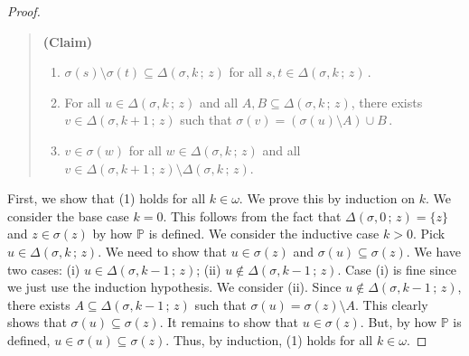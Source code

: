 \documentclass[10pt,a4paper]{amsart}
\begin{document}
\begin{proof}
\begin{quote} {\bf (Claim)}
\begin{enumerate}
  
    
  \item   $  \sigma (s)  \setminus  \sigma (t)   \subseteq       \Delta \left(  \sigma , k   \,  ;   \,   z  \right)    $
  for all $  s, t  \in     \Delta \left(  \sigma , k   \,  ;   \,   z  \right)         \,   $. 
  
  
  
  
  
  \item  For all $  u \in   \Delta \left(  \sigma , k   \,  ;   \,   z  \right)    $  and all $  A, B  \subseteq    \Delta \left(  \sigma , k   \,  ;   \,   z  \right)   $,   there exists  $  v  \in    \Delta \left(  \sigma , k+1   \,  ;   \,   z  \right)   $
  such that    $  \sigma (v)  =   \left(   \sigma (u)  \setminus   A   \right)  \cup   B      \,     $. 

  
  

  \item    $  v   \in  \sigma (w)     $  for    all   $  w  \in    \Delta \left(  \sigma , k   \,  ;   \,   z  \right)    $  and  
all $  v  \in   \Delta \left(  \sigma , k +1  \,  ;   \,   z  \right)     \setminus    \Delta \left(  \sigma , k   \,  ;   \,   z  \right)    $.  
  \end{enumerate}
 \end{quote}  




First,  we show that (1) holds for all $ k   \in  \omega   $. 
We prove this by induction on $k$. 
We consider the base case $  k =  0 $. 
This follows from the fact that  $    \Delta \left(  \sigma , 0  \,  ;   \,   z  \right)    =  \lbrace z  \rbrace  $  
and   $  z  \in    \sigma (z)        $  by how    $  \mathbb{P} $  is defined. 
We consider the inductive case   $  k >  0 $. 
Pick  $  u  \in    \Delta \left(  \sigma , k  \,  ;   \,   z  \right)   $. 
We need to show that  $  u  \in  \sigma (z)  $  and  $  \sigma (u)   \subseteq   \sigma (z)  $. 
We have two cases: 
(i)   $  u  \in     \Delta \left(  \sigma , k-1  \,  ;   \,   z  \right)    $; 
(ii) $  u  \not\in   \Delta \left(  \sigma , k-1  \,  ;   \,   z  \right)    $. 
Case  (i) is fine since we just use the induction hypothesis. 
We consider (ii). 
Since $  u  \not\in   \Delta \left(  \sigma , k-1  \,  ;   \,   z  \right)    $,   there exists   $  A  \subseteq    \Delta \left(  \sigma , k-1  \,  ;   \,   z  \right)    $  such that  
$  \sigma (u)  =  \sigma (z)  \setminus  A  $. 
This clearly shows that  $  \sigma (u)   \subseteq    \sigma (z)   $. 
It remains to show that  $  u  \in  \sigma (z)  $. 
But, by how  $  \mathbb{P} $  is defined,  $  u  \in   \sigma (u)   \subseteq   \sigma (z)  $. 
Thus, by induction,  (1)  holds for all $ k  \in  \omega  $. 







\end{proof}
\end{document}
